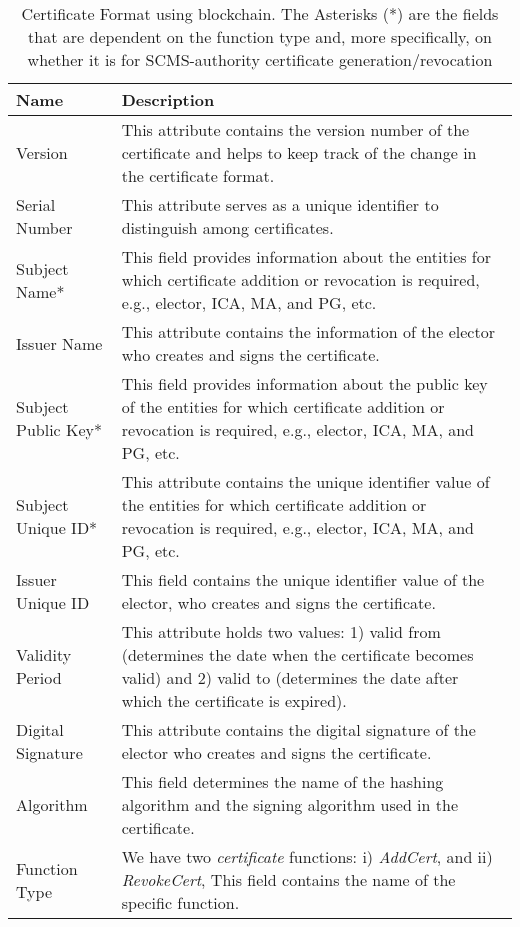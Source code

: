 \captionsetup[table]{skip=12pt}
\begin{table*}[hbt!]
\small
\centering 
{\begin{tabular}{ |l|m{14.5cm}| } 
\hline
\textbf{Name} & \textbf{Description} \\\hline
Version & This attribute contains the version number of the certificate and helps to keep track of the change in the certificate format.  \\\hline
Serial Number & This attribute serves as a unique identifier to distinguish among certificates. \\\hline 
Subject Name* & This field provides information about the entities for which certificate addition or revocation is required, e.g., elector, ICA, MA, and PG, etc. \\\hline 
Issuer Name & This attribute contains the information of the elector who creates and signs the certificate. \\\hline 
Subject Public Key* & This field provides information about the public key of the entities for which certificate addition or revocation is required, e.g., elector, ICA, MA, and PG, etc. \\\hline 
Subject Unique ID* & This attribute contains the unique identifier value of the entities for which certificate addition or revocation is required, e.g., elector, ICA, MA, and PG, etc. \\\hline
Issuer Unique ID & This field contains the unique identifier value of the elector, who creates and signs the certificate.  \\\hline
Validity Period & This attribute holds two values: 1) valid from (determines the date when the certificate becomes valid) and 2) valid to (determines the date after which the certificate is expired). \\\hline
Digital Signature & This attribute contains the digital signature of the elector who creates and signs the certificate. \\\hline 
Algorithm & This field determines the name of the hashing algorithm and the signing algorithm used in the certificate.\\\hline
Function Type & We have two \textit{certificate} functions: i) \textit{AddCert}, and ii) \textit{RevokeCert}, This field contains the name of the specific function. \\\hline
 
\end{tabular}} 

\caption{Certificate Format using blockchain. The Asterisks (*) are the fields that are dependent on the function type and, more specifically, on whether it is for SCMS-authority certificate generation/revocation}

\label{fig:certificateformat}
\vspace{-6mm}
\end{table*}



